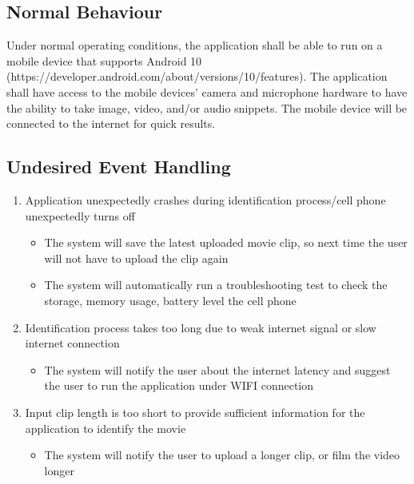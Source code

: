 \documentclass[titlepage]{article}
\begin{document}
\subsection{Normal Behaviour}
Under normal operating conditions, the application shall be able to run on a mobile device that supports Android 10 (https://developer.android.com/about/versions/10/features). The application shall have access to the mobile devices’ camera and microphone hardware to have the ability to take image, video, and/or audio snippets. The mobile device will be connected to the internet for quick results. 

\subsection{Undesired Event Handling}
\begin{enumerate}
    \item Application unexpectedly crashes during identification process/cell phone unexpectedly turns off
        \begin{itemize}
        \item The system will save the latest uploaded movie clip, so next time the user will not have to upload the clip again
        \item The system will automatically run a troubleshooting test to check the storage, memory usage, battery level the cell phone
        \end{itemize}
   \item Identification process takes too long due to weak internet signal or slow internet connection
        \begin{itemize}
        \item The system will notify the user about the internet latency and suggest the user to run the application under WIFI connection
        \end{itemize}
    \item Input clip length is too short to provide sufficient information for the application to identify the movie
        \begin{itemize}
        \item The system will notify the user to upload a longer clip, or film the video longer
        \end{itemize}
\end{enumerate}
\end{document}
